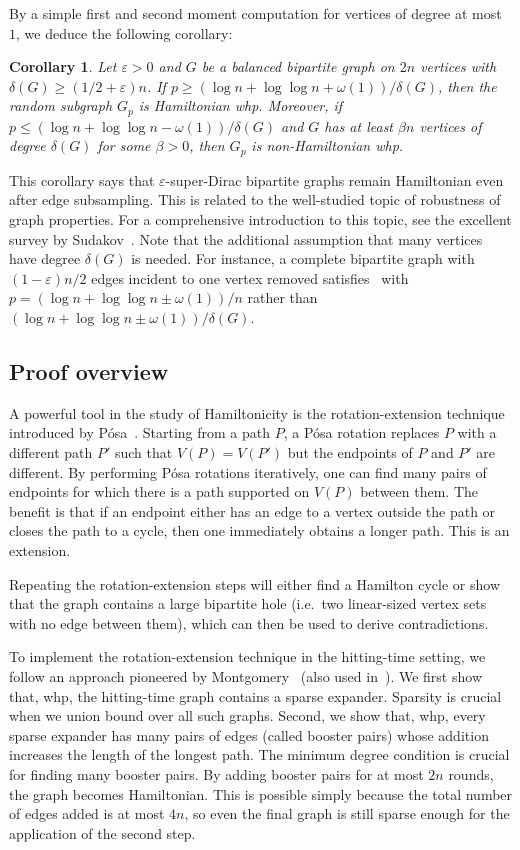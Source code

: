\documentclass[reqno,final,a4paper]{amsart}
\numberwithin{equation}{section}
\newtheorem{corollary}[theorem]{Corollary}
\theoremstyle{definition}
\theoremstyle{remark}
\newcommand{\eps}{\varepsilon}
\begin{document}
By a simple first and second moment computation for vertices of degree at most $1$, we deduce the following corollary:
\begin{corollary}\label{cor:threshold}
    Let $\eps > 0$ and $G$ be a balanced bipartite graph on $2n$ vertices with $\delta(G) \geq (1/2+\eps)n$. 
    If $p\geq (\log n + \log \log n+\omega(1))/\delta(G)$, then the random subgraph $G_p$ is Hamiltonian whp.
    Moreover,
    if $p\leq (\log n + \log \log n-\omega(1))/\delta(G)$ and $G$ has at least $\beta n$ vertices of degree $\delta(G)$ for some $\beta > 0$, then $G_p$ is non-Hamiltonian whp.
\end{corollary}
This corollary says that $\eps$-super-Dirac bipartite graphs remain Hamiltonian even after edge subsampling. This is related to the well-studied topic of robustness of graph properties. 
For a comprehensive introduction to this topic, see the excellent survey by Sudakov~\cite{Sudakov-survey}.
Note that the additional assumption that many vertices have degree $\delta(G)$ is needed. For instance, a complete bipartite graph with $(1-\eps)n/2$ edges incident to one vertex removed satisfies~ with $p = (\log n + \log \log n\pm \omega(1))/n$ rather than $(\log n + \log \log n\pm \omega(1))/\delta(G)$.



\subsection{Proof overview} 
A powerful tool in the study of Hamiltonicity is the rotation-extension technique introduced by P\'osa~\cite{Posa}. 
Starting from a path $P$, a P\'osa rotation replaces $P$ with a different path $P'$ such that $V(P) = V(P')$ but the endpoints of $P$ and $P'$ are different.
By performing P\'osa rotations iteratively, one can find many pairs of endpoints for which there is a path supported on $V(P)$ between them.
The benefit is that if an endpoint either has an edge to a vertex outside the path or closes the path to a cycle, then one immediately obtains a longer path. This is an extension.

Repeating the rotation-extension steps will either find a Hamilton cycle or show that the graph contains a large bipartite hole (i.e.\ two linear-sized vertex sets with no edge between them), which can then be used to derive contradictions.

To implement the rotation-extension technique in the hitting-time setting, we follow an approach pioneered by Montgomery~\cite{Montgomery} (also used in~\cite{Alon-Krivelevich}). We first show that, whp, the hitting-time graph contains a sparse expander. Sparsity is crucial when we union bound over all such graphs.
Second, we show that, whp, every sparse expander has many pairs of edges (called booster pairs) whose addition increases the length of the longest path. The minimum degree condition is crucial for finding many booster pairs.
By adding booster pairs for at most $2n$ rounds, the graph becomes Hamiltonian. This is possible simply because the total number of edges added is at most $4n$, so even the final graph is still sparse enough for the application of the second step.
\end{document}
